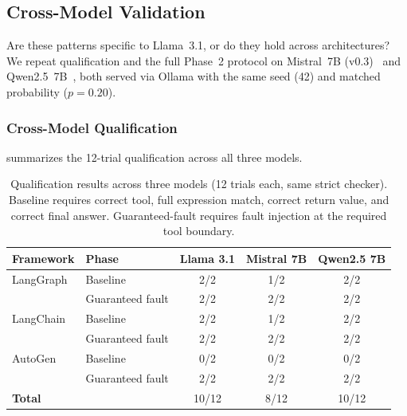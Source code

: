 \documentclass[make,article,submit,moreauthors,pdftex]{mdpi}
\begin{document}
\subsection{Cross-Model Validation}\label{sec:cross-model}

{Are these patterns specific to Llama~3.1, or do they hold across architectures? We repeat qualification and the full Phase~2 protocol on Mistral~7B (v0.3)~\cite{mistral2024} and Qwen2.5~7B~\cite{qwen25_2024}, both served via Ollama with the same seed (42) and matched probability ($p = 0.20$).}

\subsubsection{Cross-Model Qualification}

 summarizes the 12-trial qualification across all three models.

\begin{table}[htbp]
\caption{Qualification results across three models (12 trials each, same strict checker). Baseline requires correct tool, full expression match, correct return value, and correct final answer. Guaranteed-fault requires fault injection at the required tool boundary.}\label{tab:cross-model-qualification}
\centering
\begin{tabular}{llccc}
\toprule
\textbf{Framework} & \textbf{Phase} & \textbf{Llama 3.1} & \textbf{Mistral 7B} & \textbf{Qwen2.5 7B} \\
\midrule
LangGraph  & Baseline         & 2/2 & 1/2 & 2/2 \\
           & Guaranteed fault & 2/2 & 2/2 & 2/2 \\
LangChain  & Baseline         & 2/2 & 1/2 & 2/2 \\
           & Guaranteed fault & 2/2 & 2/2 & 2/2 \\
AutoGen    & Baseline         & 0/2 & 0/2 & 0/2 \\
           & Guaranteed fault & 2/2 & 2/2 & 2/2 \\
\midrule
\textbf{Total}     &                  & 10/12 & 8/12 & 10/12 \\
\bottomrule
\end{tabular}
\end{table}
\end{document}
